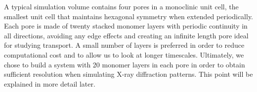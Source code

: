 A typical simulation volume contains four pores in a monoclinic unit cell,
the smallest unit cell that maintains hexagonal symmetry when extended 
periodically. Each pore is made of twenty stacked monomer layers with
periodic continuity in all directions, avoiding any edge effects and 
creating an infinite length pore ideal for studying transport. A small
number of layers is preferred in order to reduce computational cost and 
to allow us to look at longer timescales. Ultimately, we chose to build a 
system with 20 monomer layers in each pore in order to   
obtain sufficient resolution when simulating X-ray diffraction patterns.
This point will be explained in more detail later. 


